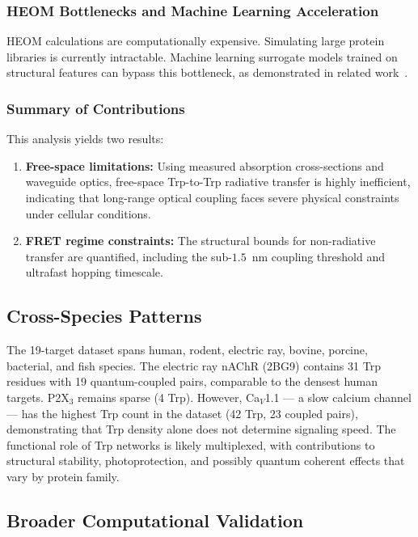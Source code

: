 \documentclass[aps,pre,twocolumn,showpacs,superscriptaddress]{revtex4-2}
\begin{document}
\subsubsection{HEOM Bottlenecks and Machine Learning Acceleration}

HEOM calculations are computationally expensive. Simulating large protein libraries is currently intractable. Machine learning surrogate models trained on structural features can bypass this bottleneck, as demonstrated in related work~\cite{MLCompanion2026}.

\subsubsection{Summary of Contributions}

This analysis yields two results:
\begin{enumerate}
\item \textbf{Free-space limitations:} Using measured absorption cross-sections and waveguide optics, free-space Trp-to-Trp radiative transfer is highly inefficient, indicating that long-range optical coupling faces severe physical constraints under cellular conditions.
\item \textbf{FRET regime constraints:} The structural bounds for non-radiative transfer are quantified, including the sub-$1.5$~nm coupling threshold and ultrafast hopping timescale.
\end{enumerate}

\subsection{Cross-Species Patterns}

The 19-target dataset spans human, rodent, electric ray, bovine, porcine, bacterial, and fish species. The electric ray nAChR (2BG9) contains 31 Trp residues with 19 quantum-coupled pairs, comparable to the densest human targets. P2X$_3$ remains sparse (4 Trp). However, Ca$_V$1.1 — a slow calcium channel — has the highest Trp count in the dataset (42 Trp, 23 coupled pairs), demonstrating that Trp density alone does not determine signaling speed. The functional role of Trp networks is likely multiplexed, with contributions to structural stability, photoprotection, and possibly quantum coherent effects that vary by protein family.

\subsection{Broader Computational Validation}
\end{document}
